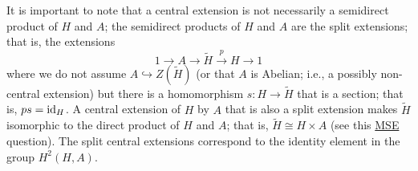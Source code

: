 \documentclass[../../rtnotes.tex]{subfiles}
\begin{document}
It is important to note that a central extension is not necessarily a semidirect product of $H$ and $A$; the semidirect products of $H$ and $A$ are the split extensions; that is, the extensions
\[1\to A\to \widetilde H\xrightarrow p H\to 1\]
where we do not assume $A\hookrightarrow Z(\widetilde H)$ (or that $A$ is Abelian; i.e., a possibly non-central extension) but there is a homomorphism $s\colon H \to\widetilde H$ that is a section; that is, $ps=\operatorname{id}_H$. A central extension of $H$ by $A$ that is also a split extension makes $\widetilde H$ isomorphic to the direct product of $H$ and $A$; that is, $\widetilde H \cong H\times A$ (see this \href{https://math.stackexchange.com/questions/2386212/central-extensions-versus-semidirect-products}{MSE} question). The split central extensions correspond to the identity element in the group $H^2(H,A)$.
\end{document}
